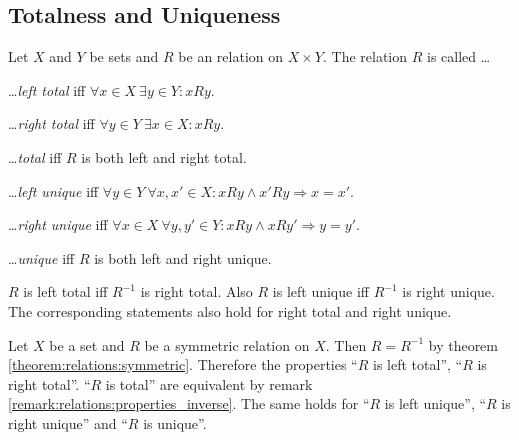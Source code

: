 \subsection{Totalness and Uniqueness}

\begin{definition}
    Let $X$ and $Y$ be sets and $R$ be an relation on $X\times Y$. The relation $R$ is called \dots
    \begin{definitionenumerate}
        \item \dots \emph{left total} iff $\forall x\in X\ \exists y\in Y\colon xRy$.
        \item \dots \emph{right total} iff $\forall y\in Y\ \exists x\in X\colon xRy$.
        \item \dots \emph{total} iff $R$ is both left and right total.
        \item \dots \emph{left unique} iff $\forall y\in Y\ \forall x,x'\in X\colon xRy\land x'Ry\Rightarrow x=x'$.
        \item \dots \emph{right unique} iff $\forall x\in X\ \forall y,y'\in Y\colon xRy\land xRy'\Rightarrow y=y'$.
        \item \dots \emph{unique} iff $R$ is both left and right unique.
    \end{definitionenumerate}
\end{definition}

\begin{remarks}
    \begin{remarkenumerate}
        \item\label{remark:relations:properties_inverse} $R$ is left total iff $R^{-1}$ is right total. Also $R$ is left unique iff $R^{-1}$ is right unique. The corresponding statements also hold for right total and right unique.
        \item Let $X$ be a set and $R$ be a symmetric relation on $X$. Then $R=R^{-1}$ by theorem \ref{theorem:relations:symmetric}. Therefore the properties \enquote{$R$ is left total}, \enquote{$R$ is right total}. \enquote{$R$ is total} are equivalent by remark \ref{remark:relations:properties_inverse}. The same holds for \enquote{$R$ is left unique}, \enquote{$R$ is right unique} and \enquote{$R$ is unique}.
    \end{remarkenumerate}
\end{remarks}

